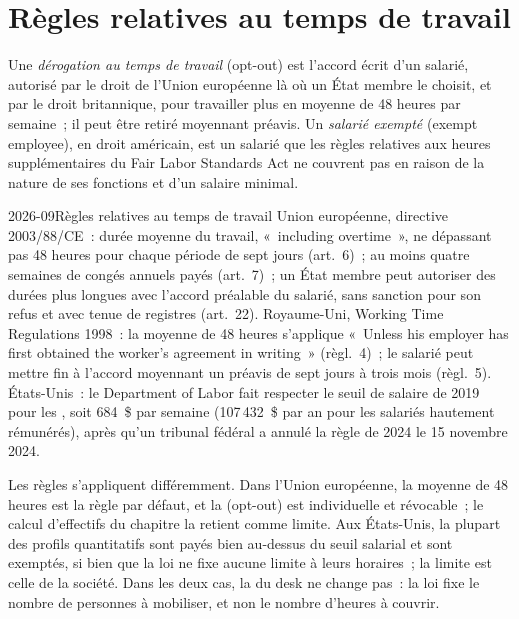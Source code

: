 \section{Règles relatives au temps de travail}

\begin{definition}\label{def:in:hours-rhythm-and-intensity:rules}
Une \emph{dérogation au temps de travail} (opt-out) est l'accord écrit d'un salarié, autorisé par le droit de l'Union européenne là où
un État membre le choisit, et par le droit britannique, pour travailler plus en moyenne de 48 heures par semaine~; il peut être retiré moyennant préavis. Un
\emph{salarié exempté} (exempt employee), en droit américain, est un salarié que les règles relatives aux heures supplémentaires du Fair Labor Standards Act ne couvrent pas
en raison de la nature de ses fonctions et d'un salaire minimal.
\end{definition}

\begin{dated}{2026-09}{Règles relatives au temps de travail}\label{dat:in:hours-rhythm-and-intensity:rules}
Union européenne, directive 2003/88/CE~: durée moyenne du travail, «~including overtime~», ne dépassant pas 48 heures pour chaque période de sept
jours (art.~6)~; au moins quatre semaines de congés annuels payés (art.~7)~; un État membre peut autoriser des durées plus longues avec l'accord
préalable du salarié, sans sanction pour son refus et avec tenue de registres (art.~22). Royaume-Uni, Working Time Regulations 1998~:
la moyenne de 48 heures s'applique «~Unless his employer has first obtained the worker's agreement in writing~» (règl.~4)~; le
salarié peut mettre fin à l'accord moyennant un préavis de sept jours à trois mois (règl.~5). États-Unis~: le Department of Labor
fait respecter le seuil de salaire de 2019 pour les , soit 684~\$ par semaine (107\,432~\$ par an pour les salariés hautement rémunérés),
après qu'un tribunal fédéral a annulé la règle de 2024 le 15 novembre 2024.
\end{dated}

Les règles s'appliquent différemment. Dans l'Union européenne, la moyenne de 48 heures est la règle par défaut, et la  (opt-out) est individuelle et
révocable~; le calcul d'effectifs du chapitre la retient comme limite. Aux États-Unis, la plupart des profils quantitatifs sont payés bien au-dessus
du seuil salarial et sont exemptés, si bien que la loi ne fixe aucune limite à leurs horaires~; la limite est celle de la société. Dans les deux cas, la
 du desk ne change pas~: la loi fixe le nombre de personnes à mobiliser, et non le nombre d'heures à couvrir.

